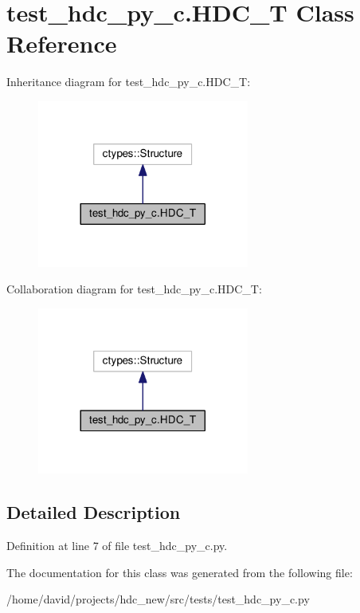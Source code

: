 \hypertarget{a00006}{}\section{test\+\_\+hdc\+\_\+py\+\_\+c.\+H\+D\+C\+\_\+T Class Reference}
\label{a00006}


Inheritance diagram for test\+\_\+hdc\+\_\+py\+\_\+c.\+H\+D\+C\+\_\+T\+:
\nopagebreak
\begin{figure}[H]
\begin{center}
\leavevmode
\includegraphics[width=197pt]{a00043}
\end{center}
\end{figure}


Collaboration diagram for test\+\_\+hdc\+\_\+py\+\_\+c.\+H\+D\+C\+\_\+T\+:
\nopagebreak
\begin{figure}[H]
\begin{center}
\leavevmode
\includegraphics[width=197pt]{a00044}
\end{center}
\end{figure}


\subsection{Detailed Description}


Definition at line 7 of file test\+\_\+hdc\+\_\+py\+\_\+c.\+py.



The documentation for this class was generated from the following file\+:\begin{DoxyCompactItemize}
\item 
/home/david/projects/hdc\+\_\+new/src/tests/test\+\_\+hdc\+\_\+py\+\_\+c.\+py\end{DoxyCompactItemize}
